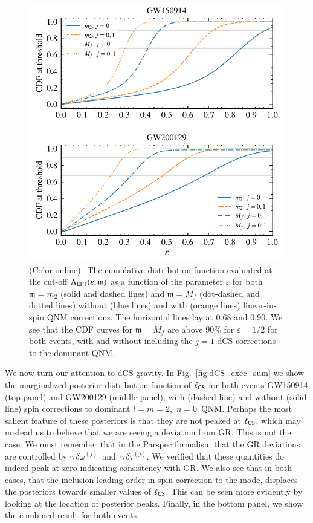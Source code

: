 \documentclass[twocolumn,
               prd,
               aps,
               superscriptaddress,
               tightenlines,
               nofootinbib,
               eqsecnum,
               amsfonts,
               amsmath,
               longbibliography]{revtex4-1}
\newcommand{\gm}{\mathfrak{m}}
\begin{document}
\begin{figure}[t]
\includegraphics[width=\columnwidth]{figs/dcs_cdf_varying_threshold.pdf}
\caption{(Color online).~The cumulative distribution function evaluated at the
cut-off $\Lambda_{\rm EFT}(\varepsilon, \gm)$ as a function of the parameter $\varepsilon$ for both
$\gm = m_2$ (solid and dashed lines) and $\gm = M_{f}$ (dot-dashed and dotted lines) without
(blue lines) and with (orange lines) linear-in-spin QNM corrections.
The horizontal lines lay at 0.68 and 0.90.
%
We see that the CDF curves for $\gm = M_{f}$ are above 90\% for $\varepsilon =
1/2$ for both events, with and without including the $j = 1$ dCS corrections to
the dominant QNM.
}
\label{fig:dcs_cdf}
\end{figure}


We now turn our attention to dCS gravity.
%
In Fig.~\ref{fig:dCS_exec_sum} we show the marginalized posterior distribution
function of $\ell_{\rm CS}$ for both events GW150914 (top panel) and GW200129
(middle panel), with (dashed line) and without (solid line) spin corrections to
dominant $l = m = 2$,~$n=0$~QNM.
%
Perhaps the most salient feature of these posteriors is that they are not
peaked at $\ell_{\rm CS}$, which may mislead us to believe that we are seeing a
deviation from GR. This is not the case.
%
We must remember that in the {\sc Parspec} formalism that the GR deviations
are controlled by $\gamma \, \delta \omega^{(j)}$~and~$\gamma \, \delta \tau^{(j)}$.
We verified that these quantities do indeed peak at zero indicating consistency with GR.
%
We also see that in both cases, that the inclusion leading-order-in-spin
correction to the mode, displaces the posteriors towards smaller values of
$\ell_{\rm CS}$. This can be seen more evidently by looking at the location of
posterior peaks.
%
Finally, in the bottom panel, we show the combined result for both events.
\end{document}
